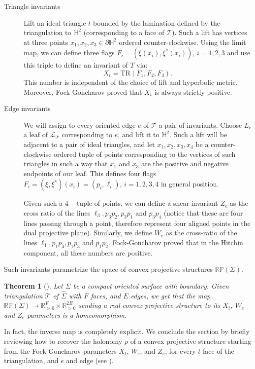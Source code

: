 \documentclass{amsart}
\newtheorem{thm}{Theorem}[section]
\theoremstyle{remark}
\theoremstyle{definition}
\begin{document}
\begin{description}
\item[Triangle invariants] 
Lift an ideal triangle $t$ bounded by the lamination defined by the triangulation to $\mathbb{H}^2$ (corresponding to a face of $\mathcal{T}$).
Such a lift has vertices at three points $x_1,x_2,x_3 \in \partial \mathbb{H}^2$ ordered counter-clockwise.
Using the limit map, we can define three flags $F_i = (\xi(x_i),\xi^*(x_i))$, $i=1,2,3$ and use this triple to define an invariant of $T$ via:
$$X_t = \text{TR} (F_1,F_2,F_3).$$
This number is independent of the choice of lift and hyperbolic metric.
Moreover, Fock-Goncharov proved that $X_t$ is always strictly positive.
\item[Edge invariants] We will assign to every oriented edge $e$ of $\mathcal{T}$ a pair of invariants.
 Choose $L_e$ a leaf of $\mathcal{L}_\mathcal{T}$ corresponding to $e$, and lift it to $\mathbb{H}^2$.
 Such a lift will be adjacent to a pair of ideal triangles, and let $x_1,x_2,x_3,x_4$ be a counter-clockwise ordered tuple of points corresponding to the vertices of such triangles in such a way that $x_1$ and $x_3$ are the positive and negative endpoints of our leaf.
 This defines four flags $F_i = (\xi,\xi^*) (x_i) = (p_i,\ell_i)$, $i=1,2,3,4$ in general position.

 Given such a $4-$tuple of points, we can define a shear invariant $Z_e$ as the cross ratio of the lines $\ell_3, p_3p_2, p_3p_1$ and $p_3p_4$ (notice that these are four lines passing through a point, therefore represent four aligned points in the dual projective plane).
 Similarly, we define $W_e$ as the cross-ratio of the lines $\ell_1, p_1p_4, p_1 p_3$ and $p_1 p_2$.
 Fock-Goncharov proved that in the Hitchin component, all these numbers are positive.
\end{description}

Such invariants parametrize the space of convex projective structures $\mathbb{RP} (\Sigma)$.

\begin{thm}[{\cite[Theorem 2.7]{fock2007moduli}}]
 Let $\Sigma$ be a compact oriented surface with boundary.
 Given triangulation $\mathcal{T}$ of $\widehat{\Sigma}$ with $F$ faces, and $E$ edges, we get that the map $\mathbb{RP}(\Sigma) \rightarrow \mathbb{R}_{>0}^F \times \mathbb{R}_{>0}^{2E}$ sending a real convex projective structure to its $X_t$, $W_e$ and $Z_e$ parameters is a homeomorphism.
\end{thm}

In fact, the inverse map is completely explicit. 
We conclude the section by briefly reviewing how to recover the holonomy $\rho$ of a convex projective structure starting from the Fock-Goncharov parameters $X_t$, $W_e$, and $Z_e$, for every $t$ face of the triangulation, and $e$ and edge (see \cite[Section 5]{fock2007moduli}).
\end{document}
